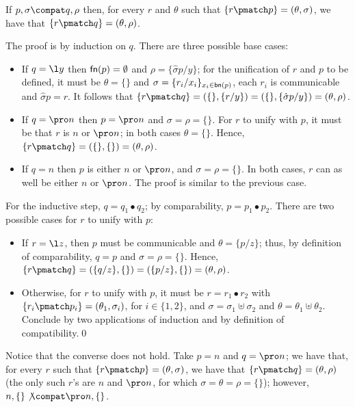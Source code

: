 \documentclass{LMCS}
\begin{document}
\begin{prop}
\label{lem:pat-lessthan}
If $p,\sigma\compat q,\rho$ then, for every $r$ and $\theta$ such that $\{r\pmatch p\}=(\theta,\sigma)$,
we have that $\{r\pmatch q\}=(\theta,\rho)$.
\end{prop}
\proof
The proof is by induction on $q$. There are three possible base cases:
\begin{itemize}
	\item If $q = \l y$ then ${\sf fn}(p)=\emptyset$ and $\rho = \{\hat\sigma p/y\}$; for the unification of
				$r$ and $p$ to be defined, it must be $\theta = \{\}$ and
				$\sigma=\{r_i/x_i\}_{x_i\in{\sf bn}(p)}$, each $r_i$ is communicable and $\hat\sigma p=r$.
				It follows that $\{r\pmatch q\}=(\{\},\{r/y\})=(\{\},\{\hat\sigma p/y\}) = (\theta, \rho)$.
	\item If $q = \pro n$ then $p = \pro n$ and $\sigma = \rho = \{\}$.
				For $r$ to unify with $p$, it must be that $r$ is $n$ or $\pro n$; in both cases $\theta = \{\}$.
				Hence, $\{r\pmatch q\}=(\{\},\{\})=(\theta,\rho)$.
	\item If $q = n$ then $p$ is either $n$ or $\pro n$, and $\sigma = \rho = \{\}$. 
				In both cases, $r$ can as well be either $n$ or $\pro n$.
				The proof is similar to the previous case.
\end{itemize}
For the inductive step, $q = q_1\bullet q_2$; by comparability, $p = p_1\bullet p_2$.
There are two possible cases for $r$ to unify with $p$:
	\begin{itemize}
	\item If $r = \l z$, then $p$ must be communicable and $\theta = \{p/z\}$; 
		thus, by definition of comparability, $q=p$ and $\sigma = \rho = \{\}$.
		Hence, $\{r\pmatch q\}=(\{q/z\},\{\})=(\{p/z\},\{\})=(\theta,\rho)$.
	\item Otherwise, for $r$ to unify with $p$, it must be $r = r_1\bullet r_2$ 
		with $\{r_i \pmatch p_i\} = (\theta_1,\sigma_i)$, for $i \in \{1,2\}$,
		and $\sigma = \sigma_1 \uplus \sigma_2$ and $\theta = \theta_1 \uplus \theta_2$. 
		Conclude by two applications of induction and by definition of compatibility.\qed
	\end{itemize}

\noindent Notice that the converse does not hold. Take $p = n$ and $q = \pro n$; we have that, for every
$r$ such that $\{r\pmatch p\}=(\theta,\sigma)$, we have that $\{r\pmatch q\}=(\theta,\rho)$ (the only
such $r$'s are $n$ and $\pro n$, for which $\sigma = \theta = \rho = \{\}$); however, $n , \{\} \not\compat
\pro n , \{\}$.
\end{document}
